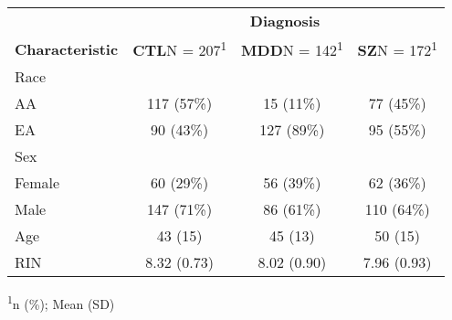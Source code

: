 \captionsetup[table]{labelformat=empty,skip=1pt}
\setlength{\LTpost}{0mm}
\begin{longtable}{lccc}
\toprule
 & \multicolumn{3}{c}{\textbf{Diagnosis}} \\
\cmidrule(lr){2-4}
\textbf{Characteristic} & \textbf{CTL}N = 207\textsuperscript{1} & \textbf{MDD}N = 142\textsuperscript{1} & \textbf{SZ}N = 172\textsuperscript{1} \\
\midrule
Race &  &  &  \\
AA & 117 (57\%) & 15 (11\%) & 77 (45\%) \\
EA & 90 (43\%) & 127 (89\%) & 95 (55\%) \\
Sex &  &  &  \\
Female & 60 (29\%) & 56 (39\%) & 62 (36\%) \\
Male & 147 (71\%) & 86 (61\%) & 110 (64\%) \\
Age & 43 (15) & 45 (13) & 50 (15) \\
RIN & 8.32 (0.73) & 8.02 (0.90) & 7.96 (0.93) \\
\bottomrule
\end{longtable}
\begin{minipage}{\linewidth}
\textsuperscript{1}n (\%); Mean (SD)\\
\end{minipage}
